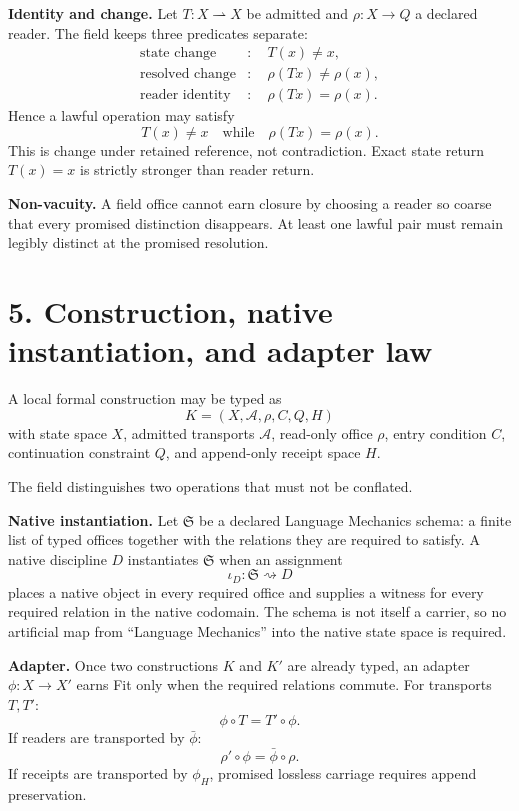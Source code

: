 \documentclass[10.5pt]{article}
\begin{document}
\textbf{Identity and change.} Let $T:X\rightharpoonup X$ be admitted and $\rho:X\to Q$ a declared reader. The field keeps three predicates separate:
\[
\begin{aligned}
\text{state change} &:\quad T(x)\neq x,\\
\text{resolved change} &:\quad \rho(Tx)\neq\rho(x),\\
\text{reader identity} &:\quad \rho(Tx)=\rho(x).
\end{aligned}
\]
Hence a lawful operation may satisfy
\[
\boxed{T(x)\neq x\quad\text{while}\quad\rho(Tx)=\rho(x).}
\]
This is change under retained reference, not contradiction. Exact state return $T(x)=x$ is strictly stronger than reader return.

\textbf{Non-vacuity.} A field office cannot earn closure by choosing a reader so coarse that every promised distinction disappears. At least one lawful pair must remain legibly distinct at the promised resolution.

\section*{5. Construction, native instantiation, and adapter law}
A local formal construction may be typed as
\[
\boxed{K=(X,\mathcal A,\rho,C,Q,H)}
\]
with state space $X$, admitted transports $\mathcal A$, read-only office $\rho$, entry condition $C$, continuation constraint $Q$, and append-only receipt space $H$.

The field distinguishes two operations that must not be conflated.

\textbf{Native instantiation.} Let $\mathfrak S$ be a declared Language Mechanics schema: a finite list of typed offices together with the relations they are required to satisfy. A native discipline $D$ instantiates $\mathfrak S$ when an assignment
\[
\iota_D:\mathfrak S\rightsquigarrow D
\]
places a native object in every required office and supplies a witness for every required relation in the native codomain. The schema is not itself a carrier, so no artificial map from ``Language Mechanics'' into the native state space is required.

\textbf{Adapter.} Once two constructions $K$ and $K'$ are already typed, an adapter $\phi:X\to X'$ earns Fit only when the required relations commute. For transports $T,T'$:
\[
\boxed{\phi\circ T=T'\circ\phi.}
\]
If readers are transported by $\bar\phi$:
\[
\boxed{\rho'\circ\phi=\bar\phi\circ\rho.}
\]
If receipts are transported by $\phi_H$, promised lossless carriage requires append preservation.
\end{document}
